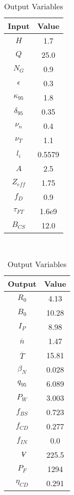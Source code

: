 \begin{table}[h!]
\centering  
\caption{Charybdis Variables}
\hfill
\begin{subtable}[t]{0.4\textwidth}
\centering  
\caption{Input Variables} ~\\
\begin{tabular}{ c|c } 

Input            & Value           \\
\hline
$H$              & 1.7              \\
$Q$              & 25.0             \\
$N_{G}$          & 0.9              \\
$\epsilon$       & 0.3              \\
$\kappa_{95}$    & 1.8              \\
$\delta_{95}$    & 0.35             \\
$\nu_{n}$        & 0.4              \\
$\nu_{T}$        & 1.1              \\
$l_{i}$          & 0.5579         \\
$A$              & 2.5              \\
$Z_{eff}$        & 1.75             \\
$f_{D}$          & 0.9              \\
$\tau_{FT}$      & 1.6e9            \\
$B_{CS}$         & 12.0             \\

\end{tabular}
\end{subtable}
\hfill
\begin{subtable}[t]{0.5\textwidth}
\centering  
\caption{Output Variables} ~\\
\begin{tabular}{ c|c } 

Output           & Value       \\
\hline
$R_{0}$          & 4.13            \\
$B_{0}$          & 10.28            \\
$I_{P}$          & 8.98            \\
$\overline n$    & 1.47            \\
$\overline T$    & 15.81           \\
$\beta_{N}$       & 0.028            \\
$q_{95}$         & 6.089            \\
$P_{W}$          & 3.003            \\
$f_{BS}$         & 0.723           \\
$f_{CD}$         & 0.277           \\
$f_{IN}$         & 0.0              \\
$\volume$         & 225.5            \\
$P_{F}$          & 1294           \\
$\eta_{CD}$      & 0.291           \\


\end{tabular}
\end{subtable}
\end{table}
